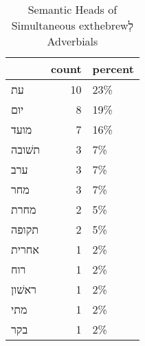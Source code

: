 \begin{table}[htbp!]
\centering
\caption{Semantic Heads of Simultaneous 	exthebrew{לְ} Adverbials}
\label{table:siml_head_cp}
\begin{tabular}{lrl}
\toprule
{} &  count & percent \\
\midrule
עת     &     10 &     23\% \\
יום    &      8 &     19\% \\
מועד   &      7 &     16\% \\
תשׁובה &      3 &      7\% \\
ערב    &      3 &      7\% \\
מחר    &      3 &      7\% \\
מחרת   &      2 &      5\% \\
תקופה  &      2 &      5\% \\
אחרית  &      1 &      2\% \\
רוח    &      1 &      2\% \\
ראשׁון &      1 &      2\% \\
מתי    &      1 &      2\% \\
בקר    &      1 &      2\% \\
\bottomrule
\end{tabular}
\end{table}
